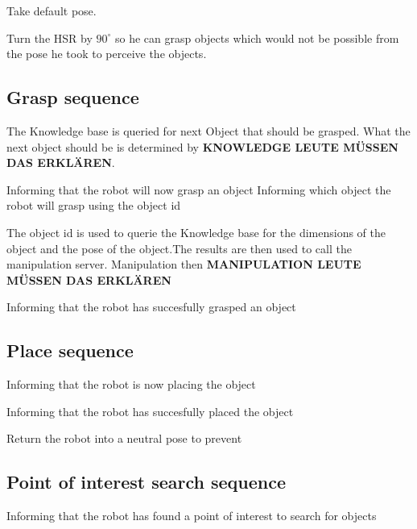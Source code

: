 \documentclass[main.tex]{subfiles}
\begin{document}
	Take default pose.
	
		
	Turn the HSR by $90^\circ$ so he can grasp objects which would not be possible from the pose he took to perceive the objects.
	
	\subsection{Grasp sequence}
	
    The Knowledge base is queried for next Object that should be grasped.
	What the next object should be is determined by \textbf{KNOWLEDGE LEUTE MÜSSEN DAS ERKLÄREN}.	
	
	Informing that the robot will now grasp an object
	Informing which object the robot will grasp using the object id
	
	The object id is used to querie the Knowledge base for the dimensions of the object and the pose of the object.The results are then used to call the manipulation server. Manipulation then \textbf{MANIPULATION LEUTE MÜSSEN DAS ERKLÄREN}
	 
	Informing that the robot has succesfully grasped an object
	
	\subsection{Place sequence}
	
	Informing that the robot is now placing the object

	 
	Informing that the robot has succesfully placed the object

	Return the robot into a neutral pose to prevent 
	
	\subsection{Point of interest search sequence}
    Informing that the robot has found a point of interest to search for objects
    
\end{document}
